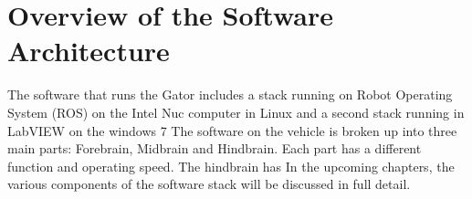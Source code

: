 \documentclass[12pt]{report}
\begin{document}
\renewcommand{\thefootnote}{\arabic{footnote}}



\tableofcontents

\newpage

\listoffigures

\newpage

\listoftables

\newpage

\newpage

\newpage

\newpage
%
\chapter{Overview of the Software Architecture}
The software that runs the Gator includes a stack running on Robot Operating System (ROS) on the Intel Nuc computer in Linux and a second stack running in LabVIEW on the windows 7 %
%
\noindent The software on the vehicle is broken up into three main parts: Forebrain, Midbrain and Hindbrain. Each part has a different function and operating speed. The hindbrain has %
%
In the upcoming chapters, the various components of the software stack will be discussed in full detail.

\newpage

\newpage

\newpage

\newpage

\end{document}
